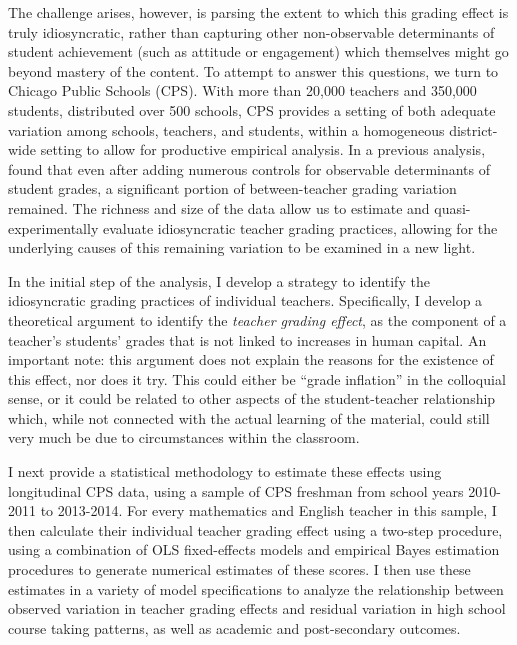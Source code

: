 \documentclass[../thesis_main.tex]{subfiles}
\begin{document}
The challenge arises, however, is parsing the extent to which this grading effect is truly idiosyncratic, rather than capturing other non-observable determinants of student achievement (such as attitude or engagement) which themselves might go beyond mastery of the content.  To attempt to answer this questions, we turn to Chicago Public Schools (CPS). With more than 20,000 teachers and 350,000 students, distributed over 500 schools, CPS provides a setting of both adequate variation among schools, teachers, and students, within a homogeneous district-wide setting to allow for productive empirical analysis. In a previous analysis, \citet{allensworthWhyStudentsGet2018} found that even after adding numerous controls for observable determinants of student grades, a significant portion of between-teacher grading variation remained. The richness and size of the data allow us to estimate and quasi-experimentally evaluate idiosyncratic teacher grading practices, allowing for the underlying causes of this remaining variation to be examined in a new light. 

In the initial step of the analysis, I develop a strategy to identify the idiosyncratic grading practices of individual teachers. Specifically, I develop a theoretical argument to identify the \textit{teacher grading effect}, as the component of a teacher's students' grades that is not linked to increases in human capital. An important note: this argument does not explain the reasons for the existence of this effect, nor does it try. This could either be ``grade inflation'' in the colloquial sense, or it could be related to other aspects of the student-teacher relationship which, while not connected with the actual learning of the material, could still very much be due to circumstances within the classroom. 

I next provide a statistical methodology to estimate these effects using longitudinal CPS data, using a sample of CPS freshman from school years 2010-2011 to 2013-2014. For every mathematics and English teacher in this sample, I then calculate their individual teacher grading effect using a two-step procedure, using a combination of OLS fixed-effects models and empirical Bayes estimation procedures to generate numerical estimates of these scores. I then use these estimates in a variety of model specifications to analyze the relationship between observed variation in teacher grading effects and residual variation in high school course taking patterns, as well as academic and post-secondary outcomes. 
\end{document}
